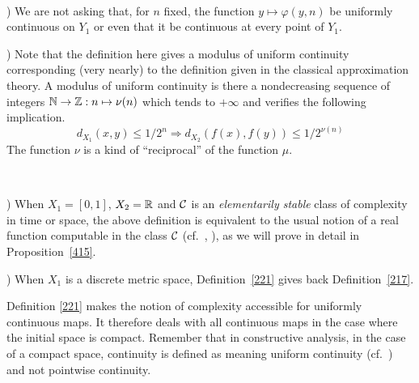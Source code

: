 \begin{remarks} \label{222}~

) We are not asking that, for $n$ fixed, the function $y \mapsto\varphi(y,n)$ be uniformly continuous on $Y_1$ or even that it be continuous at every point of $Y_1$.

) Note that the definition here gives a modulus of uniform continuity corresponding (very nearly) to the definition given in  the classical approximation theory. A modulus of uniform continuity is there a nondecreasing sequence of integers 
$\mathbb {N}\to\mathbb {Z}: n \mapsto \nu(n)$ which tends to $+\infty$ and verifies the following implication.
\[
d_{X_1}(x,y) \leq 1/2^n \Rightarrow d_{X_2}(f(x),f(y)) \leq 1/2^{\nu(n)}
\]
The function $\nu$ is a kind of ``reciprocal'' of the function $\mu$.
\end{remarks}

\begin{examples}\label{223}~

) When $X_1 = [0,1]$, $X_2 = \mathbb {R}$ and ${{\cal C}}$ is an \emph{elementarily stable} class of complexity in time or space, the above definition is equivalent to the usual notion of a real function computable in the class ${{\cal C}}$ (cf.\ \cite{KF82}, \cite{Ko91}), as we will prove in detail in Proposition~\ref{415}. 

) When $X_1$ is a discrete metric space, Definition~\ref{221} gives back  Definition~\ref{217}. 
\end{examples}

Definition \ref{221} makes the notion of complexity accessible for uniformly continuous maps. It therefore deals with all continuous maps in the case where the initial space is compact. 
Remember that in constructive analysis, in the case of a compact space, continuity is defined as meaning uniform continuity (cf.\ \cite{Bi}) and not pointwise continuity. 


